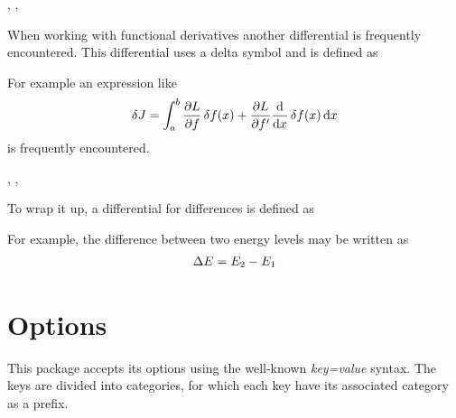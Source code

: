 \begin{function}{\fdif}
	\begin{syntax}
		\sarg, , 
	\end{syntax}
	When working with functional derivatives another differential is frequently encountered. This differential uses a delta symbol and is defined as
	
	\begin{definition}
		\DeclareDifferential{\fdif}{\delta}
	\end{definition}
	
	\noindent For example an expression like
	\begin{align*}
		\fdif{J} = \int_{a}^{b} \pdv{L}{f} \fdif{f(x)} + \pdv{L}{f'} \odv*{ \fdif{f(x)} }{x} \odif{x}
	\end{align*}
	is frequently encountered.
\end{function}

\begin{function}{\adif}
	\begin{syntax}
		\sarg, , \marg{variables}
	\end{syntax}
	To wrap it up, a differential for differences is defined as
	
	\begin{definition}
		\DeclareDifferential{\adif}{\Delta}
	\end{definition}
	
	\noindent For example, the difference between two energy levels may be written as
	\begin{align*}
		\adif{E} = E_2 - E_1
	\end{align*}
\end{function}
	
	\clearpage
	\section{Options}

This package accepts its options using the well-known \emph{key=value} syntax. The keys are divided into categories, for which each key have its associated category as a prefix.

